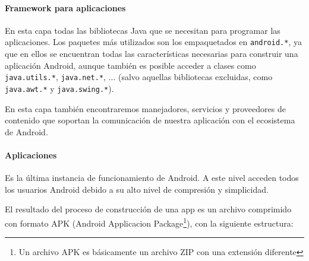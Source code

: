 \paragraph{Framework para aplicaciones}

En esta capa todas las bibliotecas Java que se necesitan para programar las
aplicaciones. Los paquetes más utilizados son los empaquetados en
\texttt{android.*}, ya que en ellos se encuentran todas las características
necesarias para construir una aplicación Android, aunque también es posible
acceder a clases como \texttt{java.utils.*}, \texttt{java.net.*}, ... (salvo
aquellas bibliotecas excluidas, como \texttt{java.awt.*} y
\texttt{java.swing.*}).

En esta capa también encontraremos manejadores, servicios y proveedores de
contenido que soportan la comunicación de nuestra aplicación con el ecosistema
de Android.


\paragraph{Aplicaciones}

Es la última instancia de funcionamiento de Android. A este nivel acceden todos
los usuarios Android debido a su alto nivel de compresión y simplicidad.

El resultado del proceso de construcción de una app es un archivo comprimido con
formato APK (Android Applicacion Package\footnote{Un archivo APK es básicamente
  un archivo ZIP con una extensión diferente}), con la siguiente estructura:

